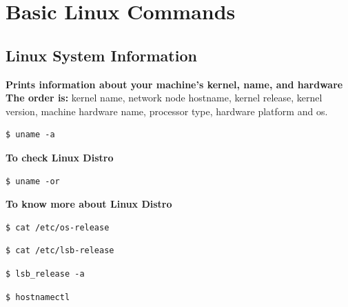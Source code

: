 \documentclass{article}
\newenvironment{codetemplate}[1][]{%
  \mybasecolorbox[#1]
  \itshape
}{%
  \endmybasecolorbox
}
\begin{document}
\newpage
\section{Basic Linux Commands}

\subsection{Linux System Information}
\textbf{Prints information about your machine’s kernel, name, and hardware}
\\ \textbf{The order is: }kernel name, network node hostname, kernel release, kernel version, machine hardware name, processor type, hardware platform and os.
\begin{codetemplate}{}
\begin{verbatim}
$ uname -a
\end{verbatim}
\end{codetemplate}

\textbf{To check Linux Distro}
\begin{codetemplate}{}
\begin{verbatim}
$ uname -or
\end{verbatim}
\end{codetemplate}

\textbf{To know more about Linux Distro}
\begin{codetemplate}{}
\begin{verbatim}
$ cat /etc/os-release
\end{verbatim}
\end{codetemplate}
\begin{codetemplate}{}
\begin{verbatim}
$ cat /etc/lsb-release
\end{verbatim}
\end{codetemplate}
\begin{codetemplate}{}
\begin{verbatim}
$ lsb_release -a
\end{verbatim}
\end{codetemplate}
\begin{codetemplate}{}
\begin{verbatim}
$ hostnamectl
\end{verbatim}
\end{codetemplate}
\end{document}

